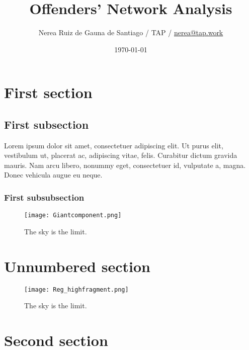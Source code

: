 \documentclass[12pt]{article}
\title{Offenders’ Network Analysis}
\author{Nerea Ruiz de Gauna de Santiago \newline / TAP / \href{mailto:nerea@tap.work}{nerea@tap.work} }
\date{\today}
\begin{document}
\maketitle

\tableofcontents
\clearpage

\newpage

\section{First section}
\lipsum[1]

\fullboxbegin
\lipsum[1]
\fullboxend

\lipsum[1]

\subsection{First subsection}
\lipsum[1]

\leftboxbegin
Lorem ipsum dolor sit amet, consectetuer adipiscing elit. Ut purus elit, vestibulum ut, placerat ac, adipiscing vitae, felis. Curabitur dictum gravida mauris. Nam arcu libero, nonummy eget, consectetuer id, vulputate a, magna. Donec vehicula augue eu neque. 
\leftboxend

\lipsum[1-2]

\subsubsection{First subsubsection}

\lipsum[1]

\begin{figure}[!h]
\centering
\texttt{[image: Giantcomponent.png]}
\caption{The sky is the limit.}
\label{fig:giantcomponent}
\end{figure}

\section*{Unnumbered section}
\lipsum[1]



\begin{figure}[!h]
\centering
\texttt{[image: Reg\_highfragment.png]}
\caption{The sky is the limit.}
\label{fig:reg_highfragment}
\end{figure}

\section{Second section}
\end{document}
